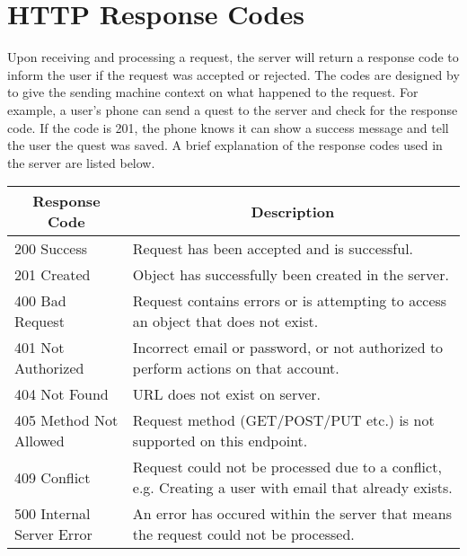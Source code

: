 \chapter{HTTP Response Codes}

Upon receiving and processing a request, the server will return a response code to inform the user if the request was accepted or rejected.
The codes are designed by \cite{rfc7231} to give the sending machine context on what happened to the request.
For example, a user's phone can send a quest to the server and check for the response code.
If the code is 201, the phone knows it can show a success message and tell the user the quest was saved.
A brief explanation of the response codes used in the server are listed below.

\bigskip

\begin{tabularx}{\linewidth}{|p{3cm}|X|}\hline
\multicolumn{1}{|c|}{\textbf{Response Code}} & \multicolumn{1}{c|}{\textbf{Description}}                                                              \\ \hline
200 Success                                  & Request has been accepted and is successful.                                                           \\ \hline
201 Created                                  & Object has successfully been created in the server.                                                    \\ \hline
400 Bad Request                              & Request contains errors or is attempting to access an object that does not exist.                      \\ \hline
401 Not Authorized                           & Incorrect email or password, or not authorized to perform actions on that account.                     \\ \hline
404 Not Found                                & URL does not exist on server.                                                                          \\ \hline
405 Method Not Allowed                       & Request method (GET/POST/PUT etc.) is not supported on this endpoint.                                  \\ \hline
409 Conflict                                 & Request could not be processed due to a conflict, e.g. Creating a user with email that already exists. \\ \hline
500 Internal Server Error                    & An error has occured within the server that means the request could not be processed.                  \\ \hline
\end{tabularx} 